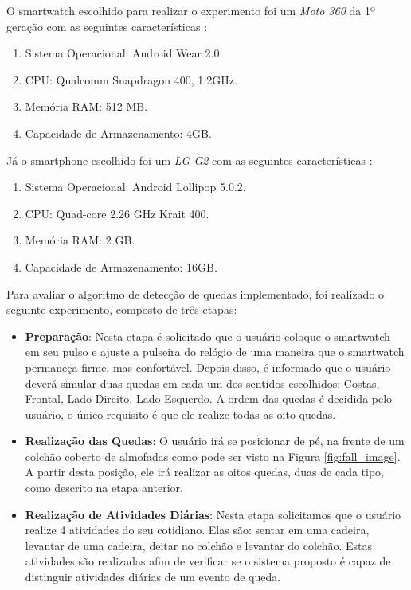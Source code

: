  
O smartwatch escolhido para realizar o experimento foi um \textit{Moto 360} da 1º geração com as seguintes características \citep{moto360}:

	\begin{enumerate}
		\item Sistema Operacional: Android Wear 2.0.
		\item CPU: Qualcomm Snapdragon 400, 1.2GHz.
		\item Memória RAM: 512 MB.
		\item Capacidade de Armazenamento: 4GB.
	\end{enumerate}
	
Já o smartphone escolhido foi um \textit{LG G2} com as seguintes características \citep{lg_g2}:

	\begin{enumerate}
		\item Sistema Operacional: Android  Lollipop 5.0.2.
		\item CPU: Quad-core 2.26 GHz Krait 400.
		\item Memória RAM: 2 GB.
		\item Capacidade de Armazenamento: 16GB.
	\end{enumerate}


Para avaliar o algoritmo de detecção de quedas implementado, foi realizado o seguinte experimento, composto de três etapas:

\begin{itemize}
	\item{\textbf{Preparação}: Nesta etapa é solicitado que o usuário coloque o smartwatch em seu pulso e ajuste a pulseira do relógio de uma maneira que o smartwatch permaneça firme, mas confortável. Depois disso, é informado que o usuário deverá simular duas quedas em cada um dos sentidos escolhidos: Costas, Frontal, Lado Direito, Lado Esquerdo. A ordem das quedas é decidida pelo usuário, o único requisito é que ele realize todas as oito quedas. }
	
	\item{\textbf{Realização das Quedas}: O usuário irá se posicionar de pé, na frente de um colchão coberto de almofadas como pode ser visto na Figura \ref{fig:fall_image}. A partir desta posição, ele irá realizar as oitos quedas, duas de cada tipo, como descrito na etapa anterior. }
	
	\item{\textbf{Realização de Atividades Diárias}: Nesta etapa solicitamos que o usuário realize 4 atividades do seu cotidiano. Elas são: sentar em uma cadeira, levantar de uma cadeira, deitar no colchão e levantar do colchão. Estas atividades são realizadas afim de verificar se o sistema proposto é capaz de distinguir atividades diárias de um evento de queda.}
	
	
\end{itemize}


